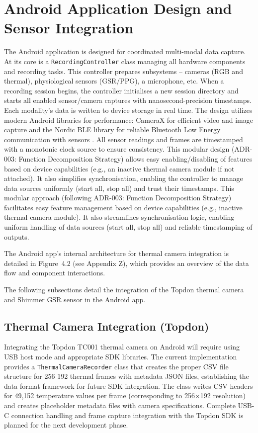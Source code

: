 \section{Android Application Design and Sensor Integration}\label{sec:4-2}
The Android application is designed for coordinated multi-modal data capture. At its core is a \texttt{RecordingController} class managing all hardware components and recording tasks. This controller prepares subsystems -- cameras (RGB and thermal), physiological sensors (GSR/PPG), a microphone, etc. When a recording session begins, the controller initialises a new session directory and starts all enabled sensor/camera captures with nanosecond-precision timestamps. Each modality's data is written to device storage in real time. The design utilizes modern Android libraries for performance: CameraX for efficient video and image capture \cite{ref13} and the Nordic BLE library for reliable Bluetooth Low Energy communication with sensors \cite{ref14}. All sensor readings and frames are timestamped with a monotonic clock source to ensure consistency. This modular design (ADR-003: Function Decomposition Strategy) allows easy enabling/disabling of features based on device capabilities (e.g., an inactive thermal camera module if not attached). It also simplifies synchronisation, enabling the controller to manage data sources uniformly (start all, stop all) and trust their timestamps. This modular approach (following ADR-003: Function Decomposition Strategy) facilitates easy feature management based on device capabilities (e.g., inactive thermal camera module). It also streamlines synchronisation logic, enabling uniform handling of data sources (start all, stop all) and reliable timestamping of outputs.

The Android app's internal architecture for thermal camera integration is detailed in Figure~4.2 (see Appendix Z), which provides an overview of the data flow and component interactions.

The following subsections detail the integration of the Topdon thermal camera and Shimmer GSR sensor in the Android app.

\subsection{Thermal Camera Integration (Topdon)}\label{sec:4-2-1}
Integrating the Topdon TC001 thermal camera on Android will require using USB host mode and appropriate SDK libraries. The current implementation provides a \texttt{ThermalCameraRecorder} class that creates the proper CSV file structure for 256\,\texttimes\,192 thermal frames with metadata JSON files, establishing the data format framework for future SDK integration. The class writes CSV headers for 49{,}152 temperature values per frame (corresponding to 256×192 resolution) and creates placeholder metadata files with camera specifications. Complete USB-C connection handling and frame capture integration with the Topdon SDK is planned for the next development phase.

